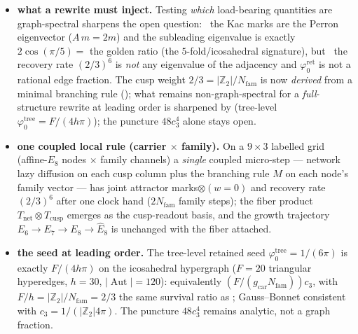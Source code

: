 \documentclass[11pt,a4paper]{article}
\newcommand{\gcar}{g_{\mathrm{car}}}
\newcommand{\Nfam}{N_{\mathrm{fam}}}
\providecommand{\Aut}{\operatorname{Aut}}
\newcommand{\phiz}{\varphi_0^{\mathrm{ret}}}
\newcommand{\Z}{\mathbb{Z}}
\begin{document}
\begin{itemize}[leftmargin=1.4em]
      $\rho(A_n)=2\cos\frac{\pi}{n+1}$ and $\rho(D_n)=2\cos\frac{\pi}{2n-2}$ are $<2$ for \emph{all} $n$, so
      neither family ever reaches $E_8$). So $P_2$ is exactly the irreducible seed on which the rule reaches
      $E_8$ as the last finite point --- a second network reading of the $(2,3,5)$ hull, not a derivation of
      $P_2$. \mO\ 
\item \textbf{what a rewrite must inject.} Testing \emph{which} load-bearing quantities are graph-spectral
      sharpens the open question: \mE\ the Kac marks are the Perron eigenvector ($A\,m{=}2m$) and the subleading
      eigenvalue is exactly $2\cos(\pi/5)=$ the golden ratio (the $5$-fold/icosahedral signature), but \mE\ the
      recovery rate $(2/3)^6$ is \emph{not} any eigenvalue of the adjacency and $\phiz$ is not a rational edge
      fraction. The cusp weight $2/3{=}|\Z_2|/\Nfam$ is now \emph{derived} from a minimal branching rule
      (); what remains non-graph-spectral for a \emph{full}-structure rewrite
      at leading order is sharpened by  (tree-level $\varphi_0^{\mathrm{tree}}=F/(4h\pi)$);
      the puncture $48c_3^4$ alone stays open. \mO\ 
\item \textbf{one coupled local rule (carrier $\times$ family).} On a $9\times3$ labelled grid (affine-$E_8$
      nodes $\times$ family channels) a \emph{single} coupled micro-step --- network lazy diffusion on each cusp
      column plus the  branching rule $M$ on each node's family vector --- has joint attractor
      marks$\otimes(w{=}0)$ and recovery rate $(2/3)^6$ after one clock hand ($2\Nfam$ family steps); the
       fiber product $T_{\mathrm{net}}\otimes T_{\mathrm{cusp}}$ emerges as the cusp-readout basis,
      and the  growth trajectory $E_6\!\to\!E_7\!\to\!E_8\!\to\!\hat E_8$ is unchanged with the
      fiber attached. \mE\ 
\item \textbf{the seed at leading order.} The tree-level retained seed
      $\varphi_0^{\mathrm{tree}}=1/(6\pi)$ is exactly $F/(4h\pi)$ on the icosahedral hypergraph
      ($F=20$ triangular hyperedges, $h=30$, $|\Aut|=120$): equivalently $(F/(\gcar\Nfam))c_3$, with
      $F/h=|\Z_2|/\Nfam=2/3$ the same survival ratio as ; Gauss--Bonnet
      consistent with $c_3=1/(|\Z_2|4\pi)$. The puncture $48c_3^4$ remains analytic, not a graph
      fraction. \mC\ 
\end{itemize}
\end{document}
